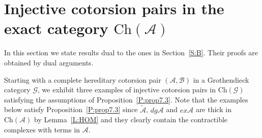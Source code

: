 \documentclass[11pt,a4paper,reqno]{amsart}
\newcommand{\A}{\mathcal{A}}
\newcommand{\B}{\mathcal{B}}
\newcommand{\G}{\mathcal{G}}
\newcommand{\Ch}{\mathrm{Ch}}
\theoremstyle{plain}
\theoremstyle{definition}
\theoremstyle{remark}
\begin{document}
 \section{Injective cotorsion pairs in the exact category $\Ch(\A)$}

 In this section we state results dual to the ones in Section~\ref{S:B}. Their proofs are obtained  by dual arguments.

%
Starting with a complete hereditary cotorsion pair $(\A, \B)$ in a Grothendieck  category $\G$, we exhibit three examples of injective cotorsion pairs in $\Ch(\G)$ satisfying the assumptions of Proposition~\ref{P:prop7.3}. Note that the examples below satisfy Proposition~\ref{P:prop7.3} since $\tilde{\A}$, $dg\A$ and $ex\A$  are thick in $\Ch(\A)$ by Lemma~\ref{L:HOM} and they clearly contain the contractible complexes with terms in $\A$.
\end{document}
